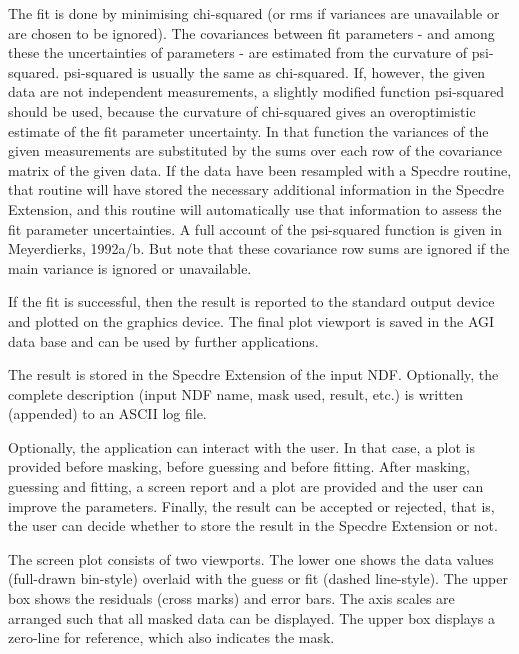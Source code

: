 {{      The fit is done by minimising chi-squared (or rms if variances are
      unavailable or are chosen to be ignored). The covariances between
      fit parameters - and among these the uncertainties of parameters -
      are estimated from the curvature of psi-squared. psi-squared is
      usually the same as chi-squared. If, however, the given data are
      not independent measurements, a slightly modified function
      psi-squared should be used, because the curvature of chi-squared
      gives an overoptimistic estimate of the fit parameter uncertainty.
      In that function the variances of the given measurements are
      substituted by the sums over each row of the covariance matrix of
      the given data. If the data have been resampled with a Specdre
      routine, that routine will have stored the necessary additional
      information in the Specdre Extension, and this routine will
      automatically use that information to assess the fit parameter
      uncertainties. A full account of the psi-squared function is given
      in Meyerdierks, 1992a/b. But note that these covariance row sums
      are ignored if the main variance is ignored or unavailable.

      If the fit is successful, then the result is reported to
      the standard output device and plotted on the graphics device. The
      final plot viewport is saved in the AGI data base and can be used
      by further applications.

      The result is stored in the Specdre Extension of the input NDF.
      Optionally, the complete description (input NDF name, mask used,
      result, etc.) is written (appended) to an ASCII log file.

      Optionally, the application can interact with the user. In that
      case, a plot is provided before masking, before guessing and
      before fitting. After masking, guessing and fitting, a screen
      report and a plot are provided and the user can improve the
      parameters. Finally, the result can be accepted or rejected, that
      is, the user can decide whether to store the result in the Specdre
      Extension or not.

      The screen plot consists of two viewports. The lower one shows the
      data values (full-drawn bin-style) overlaid with the guess or fit
      (dashed line-style). The upper box shows the residuals (cross
      marks) and error bars. The axis scales are arranged such that
      all masked data can be displayed. The upper box displays a
      zero-line for reference, which also indicates the mask.

}}
